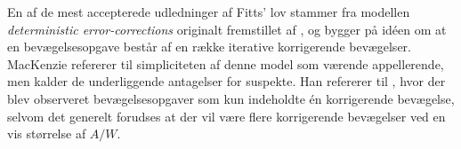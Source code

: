 En af de mest accepterede udledninger af Fitts' lov stammer fra modellen \emph{deterministic error-corrections} originalt fremstillet af \cite{crossman1983}, og bygger på idéen om at en bevægelsesopgave består af en række iterative korrigerende bevægelser. MacKenzie refererer til simpliciteten af denne model som værende appellerende, men kalder de underliggende antagelser for suspekte. Han refererer til \cite{langolf1976}, hvor der blev observeret bevægelsesopgaver som kun indeholdte én korrigerende bevægelse, selvom det generelt forudses at der vil være flere korrigerende bevægelser ved en vis størrelse af $A/W$.\\



